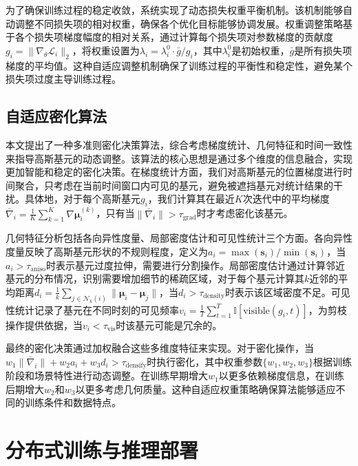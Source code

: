 为了确保训练过程的稳定收敛，系统实现了动态损失权重平衡机制。该机制能够自动调整不同损失项的相对权重，确保各个优化目标能够协调发展。权重调整策略基于各个损失项梯度幅度的相对关系，通过计算每个损失项对参数梯度的贡献度$g_i = \|\nabla_\theta \mathcal{L}_i\|_2$，将权重设置为$\lambda_i = \lambda_i^0 \cdot \bar{g} / g_i$，其中$\lambda_i^0$是初始权重，$\bar{g}$是所有损失项梯度的平均值。这种自适应调整机制确保了训练过程的平衡性和稳定性，避免某个损失项过度主导训练过程。

\subsection{自适应密化算法}

本文提出了一种多准则密化决策算法，综合考虑梯度统计、几何特征和时间一致性来指导高斯基元的动态调整。该算法的核心思想是通过多个维度的信息融合，实现更加智能和稳定的密化决策。在梯度统计方面，我们对高斯基元的位置梯度进行时间聚合，只考虑在当前时间窗口内可见的基元，避免被遮挡基元对统计结果的干扰。具体地，对于每个高斯基元$g_i$，我们计算其在最近$K$次迭代中的平均梯度$\bar{\nabla}_i = \frac{1}{K}\sum_{k=1}^K \nabla \boldsymbol{\mu}_i^{(k)}$，只有当$\|\bar{\nabla}_i\| > \tau_{\text{grad}}$时才考虑密化该基元。

几何特征分析包括各向异性度量、局部密度估计和可见性统计三个方面。各向异性度量反映了高斯基元形状的不规则程度，定义为$a_i = \max(\mathbf{s}_i) / \min(\mathbf{s}_i)$，当$a_i > \tau_{\text{aniso}}$时表示基元过度拉伸，需要进行分割操作。局部密度估计通过计算邻近基元的分布情况，识别需要增加细节的稀疏区域，对于每个基元计算其$k$近邻的平均距离$d_i = \frac{1}{k}\sum_{j \in \mathcal{N}_k(i)} \|\boldsymbol{\mu}_i - \boldsymbol{\mu}_j\|$，当$d_i > \tau_{\text{density}}$时表示该区域密度不足。可见性统计记录了基元在不同时刻的可见频率$v_i = \frac{1}{T}\sum_{t=1}^T \mathbb{I}[\text{visible}(g_i, t)]$，为剪枝操作提供依据，当$v_i < \tau_{\text{vis}}$时该基元可能是冗余的。

最终的密化决策通过加权融合这些多维度特征来实现。对于密化操作，当$w_1 \|\bar{\nabla}_i\| + w_2 a_i + w_3 d_i > \tau_{\text{densify}}$时执行密化，其中权重参数$\{w_1, w_2, w_3\}$根据训练阶段和场景特性进行动态调整。在训练早期增大$w_1$以更多依赖梯度信息，在训练后期增大$w_2$和$w_3$以更多考虑几何质量。这种自适应权重策略确保算法能够适应不同的训练条件和数据特点。

\section{分布式训练与推理部署}

